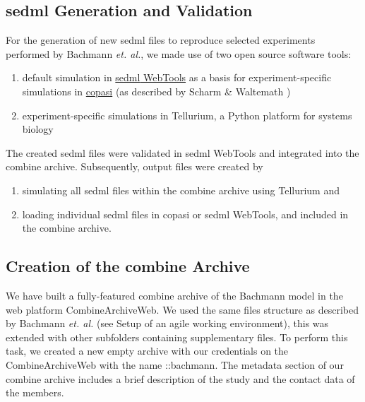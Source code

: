 \subsection*{\acs{sedml} Generation and Validation}
For the generation of new \ac{sedml} files to reproduce selected experiments performed by Bachmann \textit{et. al.}, we made use of two open source software tools:
\begin{enumerate}
    \item default simulation in \hyperlink{http://sysbioapps.spdns.org/SED-ML_Web_Tools}{\ac{sedml} WebTools} as a basis for experiment-specific simulations in \hyperlink{http://copasi.org/}{\ac{copasi}} (as described by Scharm \& Waltemath \cite{combine})
    \item experiment-specific simulations in Tellurium, a Python platform for systems biology \cite{tellurium}
\end{enumerate}

The created \ac{sedml} files were validated in \ac{sedml} WebTools and integrated into the \ac{combine} archive. Subsequently, output files were created by

\begin{enumerate}
    \item simulating all \ac{sedml} files within the \ac{combine} archive using Tellurium and
    \item loading individual \ac{sedml} files in \ac{copasi} or \ac{sedml} WebTools, and included in the \ac{combine} archive.
\end{enumerate}

\subsection*{Creation of the \acs{combine} Archive}

We have built a fully-featured \ac{combine} archive of the Bachmann model in the web platform CombineArchiveWeb. We used the same files structure as described by Bachmann \textit{et. al.} (see Setup of an agile working environment), this was extended with other subfolders containing supplementary files. To perform this task, we created a new empty archive with our credentials on the CombineArchiveWeb with the name \textsf{::bachmann}. The metadata section of our \ac{combine} archive includes a brief description of the study and the contact data of the members.

